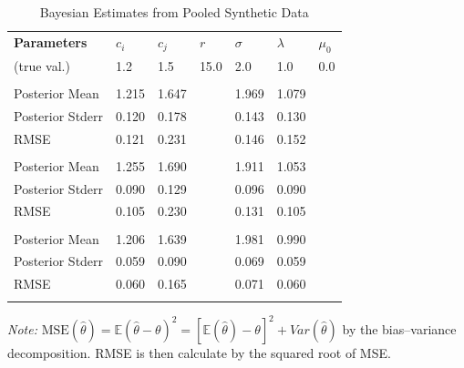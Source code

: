 \documentclass[mnsc]{informs3}
\begin{document}
\begin{table}[htbp]
\centering
\caption{Bayesian Estimates from Pooled Synthetic Data}\label{tbl-pool-synthetic-data}
\begin{tabularx}{\textwidth}{lYYYYYY}
\toprule
\textbf{Parameters} & \textbf{$c_i$} & \textbf{$c_j$} & \textbf{$r$} & \textbf{$\sigma$} & \textbf{$\lambda$} & \textbf{$\mu_0$}\\
\addlinespace[0.25ex]
\addlinespace[0.25ex]
(true val.)        & 1.2 & 1.5 & 15.0 & 2.0 & 1.0 & 0.0\\
\midrule
\addlinespace
{} \\
Posterior Mean  & 1.215 & 1.647 && 1.969 & 1.079 &\\
Posterior Stderr & 0.120 & 0.178 && 0.143 & 0.130 &\\
RMSE               & 0.121 & 0.231 && 0.146 & 0.152 &\\
\addlinespace
{} \\
Posterior Mean  & 1.255 & 1.690 && 1.911 & 1.053 &\\
Posterior Stderr & 0.090 & 0.129 && 0.096 & 0.090 &\\
RMSE                & 0.105 & 0.230 && 0.131 & 0.105 &\\
\addlinespace
{} \\
Posterior Mean  & 1.206 & 1.639 && 1.981 & 0.990 &\\
Posterior Stderr & 0.059 & 0.090 && 0.069 & 0.059 &\\
RMSE                & 0.060 & 0.165 && 0.071 & 0.060 &\\
\bottomrule
\addlinespace[0.5ex]
\end{tabularx}
\begin{minipage}{\textwidth}
{\footnotesize
\textit{Note:} $\text{MSE}(\hat\theta) = \mathbb{E}(\hat{\theta}-\theta)^2 = [\mathbb{E}(\hat{\theta}) - \theta]^2 + Var(\hat{\theta})$ by the bias–variance decomposition. RMSE is then calculate by the squared root of MSE. 
}
\end{minipage}
\end{table}

\end{document}
